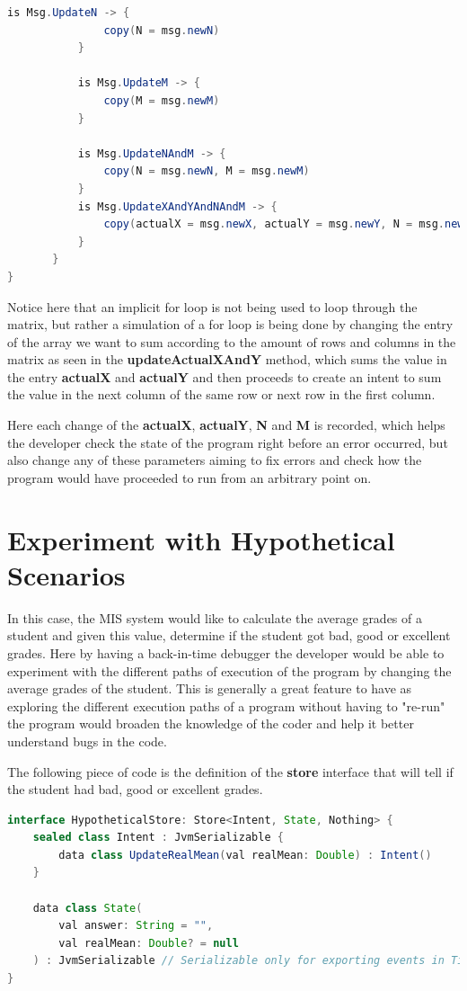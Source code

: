 \begin{lstlisting}[language=java]
           is Msg.UpdateN -> {
               copy(N = msg.newN)
           }

           is Msg.UpdateM -> {
               copy(M = msg.newM)
           }

           is Msg.UpdateNAndM -> {
               copy(N = msg.newN, M = msg.newM)
           }
           is Msg.UpdateXAndYAndNAndM -> {
               copy(actualX = msg.newX, actualY = msg.newY, N = msg.newN, M = msg.newM)
           }
       }
}

\end{lstlisting}


Notice here that an implicit for loop is not being used to loop through the matrix, but rather a simulation of a for loop is being done by changing the entry of the array we want to sum according to the amount of rows and columns in the matrix as seen in the \textbf{updateActualXAndY} method, which sums the value in the entry \textbf{actualX} and \textbf{actualY} and then proceeds to create an intent to sum the value in the next column of the same row or next row in the first column.

Here each change of the \textbf{actualX}, \textbf{actualY}, \textbf{N} and \textbf{M} is recorded, which helps the developer check the state of the program right before an error occurred, but also change any of these parameters aiming to fix errors and check how the program would have proceeded to run from an arbitrary point on.

\section{Experiment with Hypothetical Scenarios}

In this case, the MIS system would like to calculate the average grades of a student and given this value, determine if the student got bad, good or excellent grades. Here by having a back-in-time debugger the developer would be able to experiment with the different paths of execution of the program by changing the average grades of the student. This is generally a great feature to have as exploring the different execution paths of a program without having to "re-run" the program would broaden the knowledge of the coder and help it better understand bugs in the code.

The following piece of code is the definition of the \textbf{store} interface that will tell if the student had bad, good or excellent grades.

\begin{lstlisting}[language=java]
interface HypotheticalStore: Store<Intent, State, Nothing> {
    sealed class Intent : JvmSerializable {
        data class UpdateRealMean(val realMean: Double) : Intent()
    }

    data class State(
        val answer: String = "",
        val realMean: Double? = null
    ) : JvmSerializable // Serializable only for exporting events in Time Travel, no need otherwise.
}
\end{lstlisting}

